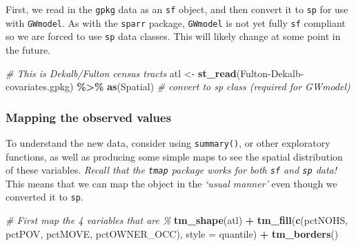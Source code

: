 \documentclass[
]{book}
\newenvironment{Shaded}{\begin{snugshade}}{\end{snugshade}}
\newcommand{\AttributeTok}[1]{\textcolor[rgb]{0.13,0.29,0.53}{#1}}
\newcommand{\CommentTok}[1]{\textcolor[rgb]{0.56,0.35,0.01}{\textit{#1}}}
\newcommand{\FunctionTok}[1]{\textcolor[rgb]{0.13,0.29,0.53}{\textbf{#1}}}
\newcommand{\NormalTok}[1]{#1}
\newcommand{\OtherTok}[1]{\textcolor[rgb]{0.56,0.35,0.01}{#1}}
\newcommand{\SpecialCharTok}[1]{\textcolor[rgb]{0.81,0.36,0.00}{\textbf{#1}}}
\newcommand{\StringTok}[1]{\textcolor[rgb]{0.31,0.60,0.02}{#1}}
\begin{document}
First, we read in the \texttt{gpkg} data as an \texttt{sf} object, and then convert it to \texttt{sp} for use with \texttt{GWmodel}. As with the \texttt{sparr} package, \texttt{GWmodel} is not yet fully \texttt{sf} compliant so we are forced to use \texttt{sp} data classes. This will likely change at some point in the future.

\begin{Shaded}
\begin{Highlighting}[]
\CommentTok{\# This is Dekalb/Fulton census tracts}
\NormalTok{atl }\OtherTok{\textless{}{-}} \FunctionTok{st\_read}\NormalTok{(}\StringTok{\textquotesingle{}Fulton{-}Dekalb{-}covariates.gpkg\textquotesingle{}}\NormalTok{) }\SpecialCharTok{\%\textgreater{}\%}
  \FunctionTok{as}\NormalTok{(}\StringTok{\textquotesingle{}Spatial\textquotesingle{}}\NormalTok{) }\CommentTok{\# convert to sp class (required for GWmodel)}
\end{Highlighting}
\end{Shaded}

\hypertarget{mapping-the-observed-values}{%
\subsubsection{Mapping the observed values}\label{mapping-the-observed-values}}

To understand the new data, consider using \texttt{summary()}, or other exploratory functions, as well as producing some simple maps to see the spatial distribution of these variables. \emph{Recall that the \texttt{tmap} package works for both \texttt{sf} and \texttt{sp} data!} This means that we can map the object in the \emph{`usual manner'} even though we converted it to \texttt{sp}.

\begin{Shaded}
\begin{Highlighting}[]
\CommentTok{\# First map the 4 variables that are \%}
\FunctionTok{tm\_shape}\NormalTok{(atl) }\SpecialCharTok{+} 
  \FunctionTok{tm\_fill}\NormalTok{(}\FunctionTok{c}\NormalTok{(}\StringTok{\textquotesingle{}pctNOHS\textquotesingle{}}\NormalTok{, }\StringTok{\textquotesingle{}pctPOV\textquotesingle{}}\NormalTok{, }\StringTok{\textquotesingle{}pctMOVE\textquotesingle{}}\NormalTok{, }\StringTok{\textquotesingle{}pctOWNER\_OCC\textquotesingle{}}\NormalTok{),}
          \AttributeTok{style =} \StringTok{\textquotesingle{}quantile\textquotesingle{}}\NormalTok{) }\SpecialCharTok{+}
  \FunctionTok{tm\_borders}\NormalTok{()}
\end{Highlighting}
\end{Shaded}
\end{document}
